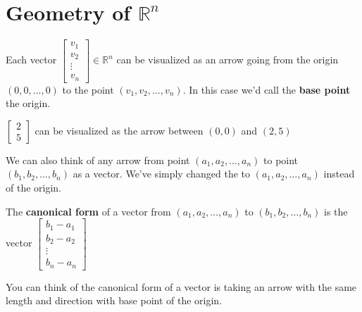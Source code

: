\section{Geometry of $\mathbb{R}^n$}

Each vector $\begin{bmatrix}v_1\\v_2 \\ \vdots \\ v_n \end{bmatrix} \in \mathbb{R}^n$ can be visualized as an arrow going from the origin 
$(0,0, \ldots, 0)$ to the point $(v_1, v_2, \ldots, v_n)$.  In this case we'd call the \textbf{base point} the origin.

\begin{example}
$\begin{bmatrix}2\\5\end{bmatrix}$ can be visualized as the arrow between $(0,0)$ and $(2,5)$\\
\end{example}

We can also think of any arrow from point $(a_1, a_2, \ldots, a_n)$ to point $(b_1, b_2, \ldots, b_n)$ as a vector. We've simply changed 
the  to $(a_1, a_2, \ldots, a_n)$ instead of the origin. 

\begin{definition}
The \textbf{canonical form} of a vector from $(a_1, a_2, \ldots, a_n)$ to $(b_1, b_2, \ldots, b_n)$ is the vector 
$\begin{bmatrix}b_1-a_1 \\ b_2-a_2 \\ \vdots \\ b_n-a_n\end{bmatrix}$
\end{definition}

\begin{remark}
You can think of the canonical form of a vector is taking an arrow with the same length and direction with base point of the origin.
\end{remark}

